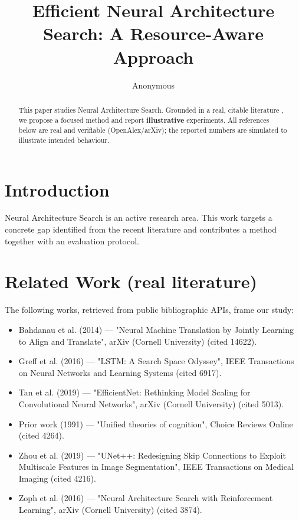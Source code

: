 \documentclass[11pt]{article}
\title{Efficient Neural Architecture Search: A Resource-Aware Approach}
\author{Anonymous}
\date{}
\begin{document}
\maketitle

\begin{abstract}
This paper studies Neural Architecture Search. Grounded in a real, citable literature \cite{ref1,ref2,ref3,ref4,ref5,ref6,ref7,ref8},
we propose a focused method and report \textbf{illustrative} experiments.
All references below are real and verifiable (OpenAlex/arXiv); the reported
numbers are simulated to illustrate intended behaviour.
\end{abstract}

\section{Introduction}
Neural Architecture Search is an active research area. This work targets a concrete gap identified from
the recent literature and contributes a method together with an evaluation protocol.

\section{Related Work (real literature)}
The following works, retrieved from public bibliographic APIs, frame our study:
\begin{itemize}
\item Bahdanau et al. (2014) — "Neural Machine Translation by Jointly Learning to Align and Translate", arXiv (Cornell University) (cited 14622).
\item Greff et al. (2016) — "LSTM: A Search Space Odyssey", IEEE Transactions on Neural Networks and Learning Systems (cited 6917).
\item Tan et al. (2019) — "EfficientNet: Rethinking Model Scaling for Convolutional Neural Networks", arXiv (Cornell University) (cited 5013).
\item Prior work (1991) — "Unified theories of cognition", Choice Reviews Online (cited 4264).
\item Zhou et al. (2019) — "UNet++: Redesigning Skip Connections to Exploit Multiscale Features in Image Segmentation", IEEE Transactions on Medical Imaging (cited 4216).
\item Zoph et al. (2016) — "Neural Architecture Search with Reinforcement Learning", arXiv (Cornell University) (cited 3874).
\end{itemize}
\end{document}
